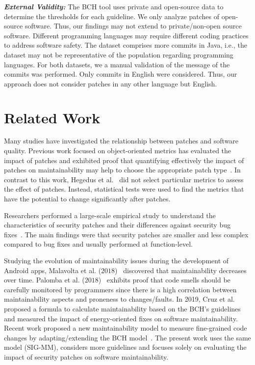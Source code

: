 \documentclass[smallextended]{svjour3}       %
\begin{document}
\textit{\textbf{External Validity:}} The BCH tool uses private and open-source data to 
determine the thresholds for each guideline. We only analyze patches of open-source software.
Thus, our findings may not extend to private/non-open source software. Different programming 
languages may require different coding practices to address software safety. The 
dataset comprises more commits in Java, i.e., the dataset may not be representative 
of the population regarding programming languages. For both datasets, we a manual validation 
of the message of the commits was performed. Only commits in English were considered. Thus, our approach does not consider 
patches in any other language but English.

\section{Related Work}\label{sec:rw}

Many studies have investigated the relationship between patches and
software quality. Previous work focused on object-oriented metrics has evaluated the
impact of patches and exhibited proof that quantifying effectively the
impact of patches on maintainability may help to choose the appropriate
patch type~\cite{1167822}. In contrast to this work, Hegedus et
al.~\cite{HEGEDUS2018313} did not select particular metrics to assess the effect
of patches. Instead, statistical tests were used to find the metrics that
have the potential to change significantly after patches. 

Researchers
performed a large-scale empirical study to understand the characteristics of security patches
and their differences against security bug fixes~\cite{10.1145/3133956.3134072}.
The main findings were that security patches are smaller and less complex compared
to bug fixes and usually performed at function-level.

Studying the evolution 
of maintainability issues during the development of Android apps, Malavolta et al. ($2018$)~\cite{8530041}
discovered that maintainability decreases over time. Palomba et al.
($2018$)~\cite{Palomba:2018:DIM:3231288.3231337} exhibits proof that code smells
should be carefully monitored by programmers since there is a high correlation
between maintainability aspects and proneness to changes/faults. In 2019, Cruz et 
al.~\cite{8919169} proposed a formula to calculate maintainability 
based on the BCH's guidelines and measured the impact of energy-oriented fixes 
on software maintainability. Recent work
proposed a new maintainability model to 
measure fine-grained code changes by adapting/extending the BCH model~\cite{8785997}.
The present work uses the same model (SIG-MM), considers more guidelines and focuses 
solely on evaluating the impact of security patches on software maintainability.
\end{document}

